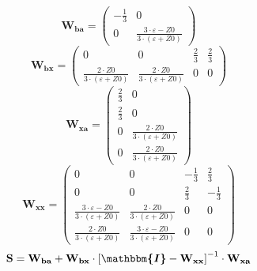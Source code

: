 \[ \mathbf{W_{ba}} = \left(\begin{array}{cc} -\frac{1}{3} & 0 \\ 0 &
\frac{3\cdot \varepsilon-Z0}{3\cdot \left(\varepsilon+Z0\right)}
\end{array}\right) \]
\[ \mathbf{W_{bx}} = \left(\begin{array}{cccc} 0 & 0 & \frac{2}{3} &
\frac{2}{3} \\ \frac{2\cdot Z0}{3\cdot \left(\varepsilon+Z0\right)} &
\frac{2\cdot Z0}{3\cdot \left(\varepsilon+Z0\right)} & 0 & 0
\end{array}\right) \]
\[ \mathbf{W_{xa}} = \left(\begin{array}{cc} \frac{2}{3} & 0 \\
\frac{2}{3} & 0 \\ 0 & \frac{2\cdot Z0}{3\cdot
\left(\varepsilon+Z0\right)} \\ 0 & \frac{2\cdot Z0}{3\cdot
\left(\varepsilon+Z0\right)} \end{array}\right) \]
\[ \mathbf{W_{xx}} = \left(\begin{array}{cccc} 0 & 0 & -\frac{1}{3} &
\frac{2}{3} \\ 0 & 0 & \frac{2}{3} & -\frac{1}{3} \\ \frac{3\cdot
\varepsilon-Z0}{3\cdot \left(\varepsilon+Z0\right)} & \frac{2\cdot
Z0}{3\cdot \left(\varepsilon+Z0\right)} & 0 & 0 \\ \frac{2\cdot
Z0}{3\cdot \left(\varepsilon+Z0\right)} & \frac{3\cdot
\varepsilon-Z0}{3\cdot \left(\varepsilon+Z0\right)} & 0 & 0
\end{array}\right) \]
\[ \mathbf{S}=\mathbf{W_{ba}}+\mathbf{W_{bx}}\cdot\left[
\boldsymbol{\mathbbm{I}}
-\mathbf{W_{xx}}\right]^{-1}\cdot\mathbf{W_{xa}} \]
